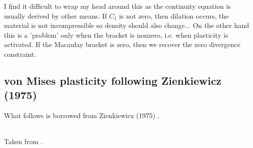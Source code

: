 I find it difficult to wrap my head around this as the continuity equation 
is usually derived by other means. 
If $C_1$ is not zero, then dilation occurs, the material is not incompressible
so density should also change...  
On the other hand this is a 'problem' only when the bracket is nonzero, i.e. when
plasticity is activated. If the Macaulay bracket is zero, then we recover 
the zero divergence constraint.

\subsection{von Mises plasticity following Zienkiewicz (1975)}

What follows is borrowed from Zienkiewicz (1975) \cite{zien75}.


\begin{center}
\\
{\captionfont Taken from \textcite{zien75}.}
\end{center}

